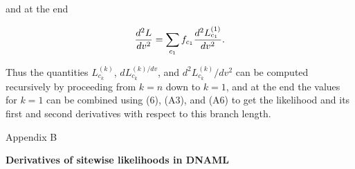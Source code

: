\documentclass[12pt]{article}
\begin{document}
\noindent
and at the end

\begin{equation}%
{d^2L \over dv^2}  = \sum_{c_1} f_{c_1} {d^2L_{c_1}^{(1)} \over dv^2}.
\end{equation}

Thus the quantities $L_{c_k}^{(k)}$, $dL_{c_k}^{(k)/dv}$, and $d^2L_{c_k}^{(k)}/dv^2$ can be computed recursively by proceeding from $k=n$ down to $k=1$, and
at the end the values for $k=1$ can be
combined using (6), (A3), and (A6) to get the likelihood and its
first and second derivatives with respect to this branch length.

\newpage

\appendix
\noindent
Appendix B
\bigskip

\def\theequation{B\arabic{equation}}
\setcounter{equation}{0}

\noindent
{\bf Derivatives of sitewise likelihoods in DNAML}
\bigskip
\end{document}
